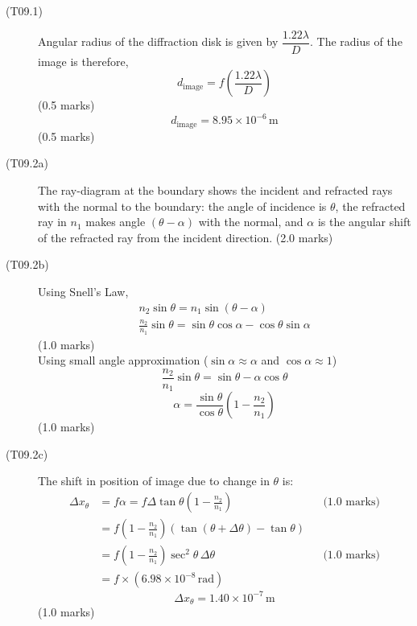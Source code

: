 \begin{description}
\item[(T09.1)]
Angular radius of the diffraction disk is given by
$\dfrac{1.22\lambda}{D}$. The radius of the image is therefore,
\[ d_{\mathrm{image}} = f\left(\frac{1.22\lambda}{D}\right) \]
\hfill(0.5 marks)
\[ d_{\mathrm{image}} = 8.95 \times 10^{-6}\,\mathrm{m} \]
\hfill(0.5 marks)

\item[(T09.2a)]
The ray-diagram at the boundary shows the incident and refracted rays with
the normal to the boundary: the angle of incidence is $\theta$, the
refracted ray in $n_1$ makes angle $(\theta - \alpha)$ with the normal, and
$\alpha$ is the angular shift of the refracted ray from the incident
direction. \hfill(2.0 marks)

\item[(T09.2b)]
Using Snell's Law,
\begin{gather*}
n_2\sin\theta = n_1\sin(\theta - \alpha) \\
\frac{n_2}{n_1}\sin\theta = \sin\theta\cos\alpha - \cos\theta\sin\alpha
\end{gather*}
\hfill(1.0 marks)\\
Using small angle approximation ($\sin\alpha \approx \alpha$ and
$\cos\alpha \approx 1$)
\[ \frac{n_2}{n_1}\sin\theta = \sin\theta - \alpha\cos\theta \]
\[ \alpha = \frac{\sin\theta}{\cos\theta}\left(1 - \frac{n_2}{n_1}\right) \]
\hfill(1.0 marks)

\item[(T09.2c)]
The shift in position of image due to change in $\theta$ is:
\begin{align*}
\Delta x_\theta &= f\alpha
  = f\Delta\tan\theta\left(1 - \frac{n_2}{n_1}\right)
  && \text{(1.0 marks)} \\
  &= f\left(1 - \frac{n_2}{n_1}\right)
     (\tan(\theta + \Delta\theta) - \tan\theta) \\
  &= f\left(1 - \frac{n_2}{n_1}\right)\sec^2\theta\,\Delta\theta
  && \text{(1.0 marks)} \\
  &= f \times (6.98 \times 10^{-8}\,\mathrm{rad})
\end{align*}
\[ \Delta x_\theta = 1.40 \times 10^{-7}\,\mathrm{m} \]
\hfill(1.0 marks)


\end{description}
